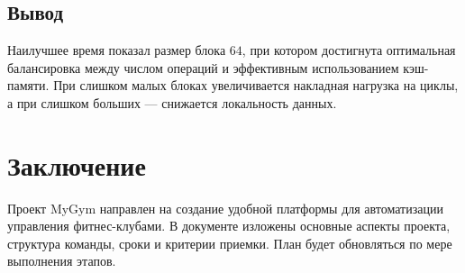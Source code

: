 \documentclass[14pt, russian]{matmex-diploma-custom}
\begin{document}
\subsection*{Вывод}

Наилучшее время показал размер блока $64$, при котором достигнута оптимальная балансировка между числом операций и эффективным использованием кэш-памяти. При слишком малых блоках увеличивается накладная нагрузка на циклы, а при слишком больших — снижается локальность данных.


\section{Заключение}
Проект MyGym направлен на создание удобной платформы для автоматизации управления фитнес-клубами. В документе изложены основные аспекты проекта, структура команды, сроки и критерии приемки. План будет обновляться по мере выполнения этапов.
\end{document}
